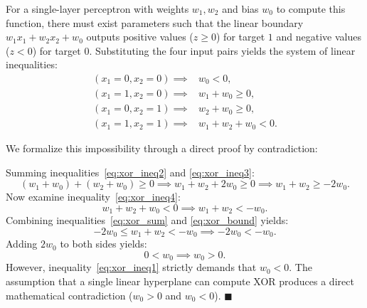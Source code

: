 \documentclass[../../main.tex]{subfiles}
\begin{document}
For a single-layer perceptron with weights $w_1, w_2$ and bias $w_0$ to compute this function, there must exist parameters such that the linear boundary $w_1 x_1 + w_2 x_2 + w_0$ outputs positive values ($z \ge 0$) for target $1$ and negative values ($z < 0$) for target $0$. Substituting the four input pairs yields the system of linear inequalities:
\begin{align}
(x_1 = 0, x_2 = 0) \implies &w_0 < 0, \label{eq:xor_ineq1} \\
(x_1 = 1, x_2 = 0) \implies &w_1 + w_0 \ge 0, \label{eq:xor_ineq2} \\
(x_1 = 0, x_2 = 1) \implies &w_2 + w_0 \ge 0, \label{eq:xor_ineq3} \\
(x_1 = 1, x_2 = 1) \implies &w_1 + w_2 + w_0 < 0. \label{eq:xor_ineq4}
\end{align}

We formalize this impossibility through a direct proof by contradiction:

Summing inequalities~\eqref{eq:xor_ineq2} and \eqref{eq:xor_ineq3}:
\begin{equation}
\label{eq:xor_sum}
(w_1 + w_0) + (w_2 + w_0) \ge 0 \implies w_1 + w_2 + 2w_0 \ge 0 \implies w_1 + w_2 \ge -2w_0.
\end{equation}
Now examine inequality~\eqref{eq:xor_ineq4}:
\begin{equation}
\label{eq:xor_bound}
w_1 + w_2 + w_0 < 0 \implies w_1 + w_2 < -w_0.
\end{equation}
Combining inequalities~\eqref{eq:xor_sum} and \eqref{eq:xor_bound} yields:
\[
-2w_0 \le w_1 + w_2 < -w_0 \implies -2w_0 < -w_0.
\]
Adding $2w_0$ to both sides yields:
\[
0 < w_0 \implies w_0 > 0.
\]
However, inequality~\eqref{eq:xor_ineq1} strictly demands that $w_0 < 0$. The assumption that a single linear hyperplane can compute XOR produces a direct mathematical contradiction ($w_0 > 0$ and $w_0 < 0$). \hfill $\blacksquare$
\end{document}
